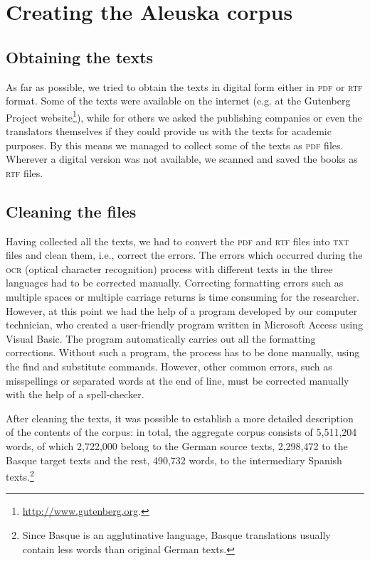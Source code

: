 \documentclass[output=paper]{LSP/langsci}
\begin{document}
\section{Creating the Aleuska corpus}
\subsection{Obtaining the texts}

As far as possible, we tried to obtain the texts in digital form either in \textsc{pdf} or \textsc{rtf} format. Some of the texts were available on the internet (e.g. at the Gutenberg Project website\footnote{\url{http://www.gutenberg.org}.}), while for others we asked the publishing companies or even the translators themselves if they could provide us with the texts for academic purposes. By this means we managed to collect some of the texts as \textsc{pdf} files. Wherever a digital version was not available, we scanned and saved the books as \textsc{rtf} files.

\subsection{Cleaning the files}

Having collected all the texts, we had to convert the \textsc{pdf} and \textsc{rtf} files into \textsc{txt} files and clean them, i.e., correct the errors. The errors which occurred during the \textsc{ocr} (optical character recognition) process with different texts in the three languages had to be corrected manually. Correcting formatting errors such as multiple spaces or multiple carriage returns is time consuming for the researcher. However, at this point we had the help of a program developed by our computer technician, who created a user-friendly program written in Microsoft Access using Visual Basic. The program automatically carries out all the formatting corrections. Without such a program, the process has to be done manually, using the find and substitute commands. However, other common errors, such as misspellings or separated words at the end of line, must be corrected manually with the help of a spell-checker.

After cleaning the texts, it was possible to establish a more detailed description of the contents of the corpus: in total, the aggregate corpus consists of 5,511,204 words, of which 2,722,000 belong to the German source texts, 2,298,472 to the Basque target texts and the rest, 490,732 words, to the intermediary Spanish texts.\footnote{Since Basque is an agglutinative language, Basque translations usually contain less words than original German texts.}
\end{document}

